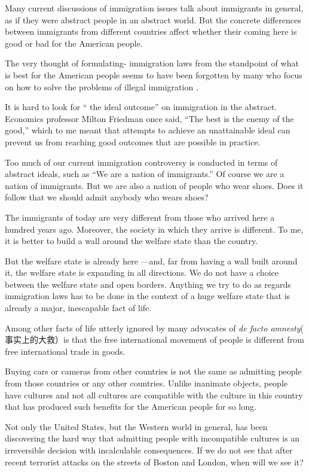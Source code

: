 \documentclass[UTF8,11pt]{ctexart}
\begin{document}
Many current discussions of immigration issues talk about immigrants in general, as if they were abstract people in an abstract world. But the concrete differences between immigrants from different countries affect whether their coming here is good or bad for the American people.


The very thought of formulating- immigration laws from the standpoint of what is best for the American people seems to have been forgotten by many who focus on how to solve the problems of illegal immigration .


It is hard to look for “ the ideal outcome” on immigration in the abstract. Economics professor Milton Friedman once said, “The best is the enemy of the good,” which to me meant that attempts to achieve an unattainable ideal can prevent us from reaching good outcomes that are possible in practice.


Too much of our current immigration controversy is conducted in terms of abstract ideals, such as “We are a nation of immigrants.” Of course we are a nation of immigrants. But we are also a nation of people who wear shoes. Does it follow that we should admit anybody who wears shoes?


The immigrants of today are very different from those who arrived here a hundred years ago. Moreover, the society in which they arrive is different. To me, it is better to build a wall around the welfare state than the country.


But the welfare state is already here —and, far from having a wall built around it, the welfare state is expanding in all directions. We do not have a choice between the welfare state and open borders. Anything we try to do as regards immigration laws has to be done in the context of a huge welfare state that is already a major, inescapable fact of life.


Among other facts of life utterly ignored by many advocates of\textit{ de facto amnesty}( 事实上的大救）is that the free international movement of people is different from free international trade in goods.


Buying cars or cameras from other countries is not the same as admitting people from those countries or any other countries. Unlike inanimate objects, people have cultures and not all cultures are compatible with the culture in this country that has produced such benefits for the American people for so long.


Not only the United States, but the Western world in general, has been discovering the hard way that admitting people with incompatible cultures is an irreversible decision with incalculable consequences. If we do not see that after recent terrorist attacks on the streets of Boston and London, when will we see it?
\end{document}
